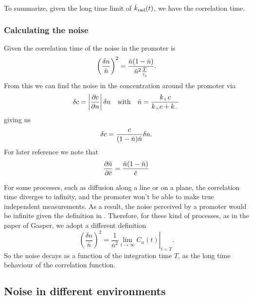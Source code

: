 To summarize, given the long time limit of $\hat{k}_{\rm rad}(t)$, we have the correlation time.

\subsubsection{Calculating the noise}
Given the correlation time of the noise in the promoter is
\begin{equation}
 \left( \frac{\delta n}{\bar{n}} \right)^2 = \frac{\bar{n}(1-\bar{n})}{\bar{n}^2\frac{T}{\tau_c}}.
 \elabel{EqProNoise}
\end{equation}
From this we can find the noise in the concentration around the promoter via
\begin{equation}
 \delta c = \left|\frac{\partial c}{\partial n}\right| \delta n \quad {\rm with} \quad \bar{n} = \frac{k_+ c}{k_+ c + k_-}
\end{equation}
giving us
\begin{equation}
 \delta c = \frac{c}{(1-\bar{n})\bar{n}}\delta n.
 \elabel{EqConNoise}
\end{equation}
For later reference we note that
\begin{equation}
 \frac{\partial \bar{n}}{\partial \bar{c}} = \frac{\bar{n}(1-\bar{n})}{\bar{c}}
 \elabel{EqProNoiseII}
\end{equation}

For some processes, such as diffusion along a line or on a plane, the correlation time diverges to infinity, and the promoter won't be able to make true independent measurements. As a result, the noise perceived by a promoter would be infinite given the definition in . Therefore, for these kind of processes, as in the paper of Gasper, we adopt a different definition
\begin{equation}
  \left( \frac{\delta n}{\bar{n}} \right)^2 = \left. \frac{1}{\bar{n}^2} \lim_{t \rightarrow \infty} C_n(t)  \right|_{t = T}.
\end{equation}
So the noise decays as a function of the integration time $T$, as the long time behaviour of the correlation function.


\subsection{Noise in different environments}

